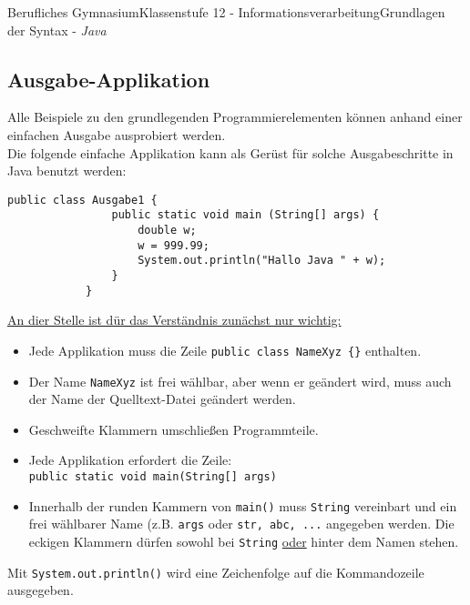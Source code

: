 \documentclass[11pt,oneside,openany,headings=optiontotoc,11pt,numbers=noenddot]{article}
\begin{document}
\begin{worksheet}{Berufliches Gymnasium}{Klassenstufe 12 - Informationsverarbeitung}{Grundlagen der Syntax - \textit{Java}}
		\subsection{Ausgabe-Applikation}
		Alle Beispiele zu den grundlegenden Programmierelementen können anhand einer einfachen Ausgabe ausprobiert werden.\\
		Die folgende \grqq{}einfache\grqq{} Applikation kann als Gerüst für solche Ausgabeschritte in Java benutzt werden:
		\begin{lstlisting}[style=JavaInputStyle]
			public class Ausgabe1 {
				public static void main (String[] args) {
					double w;
					w = 999.99;
					System.out.println("Hallo Java " + w);
				}
			}
		\end{lstlisting}
		\underline{An dier Stelle ist dür das Verständnis zunächst nur wichtig:}
		\begin{itemize}
			\item Jede Applikation muss die Zeile \lstinline[style=JavaInputStyle]|public class NameXyz {}| enthalten.
			\item Der Name \lstinline[style=JavaInputStyle]|NameXyz| ist frei wählbar, aber wenn er geändert wird, muss auch der Name der Quelltext-Datei geändert werden.
			\item Geschweifte Klammern {} umschließen Programmteile.
			\item Jede Applikation erfordert die Zeile:\\
			\lstinline[style=JavaInputStyle]|public static void main(String[] args)|
			\item Innerhalb der runden Kammern von \lstinline[style=JavaInputStyle]|main()| muss \lstinline[style=JavaInputStyle]|String| vereinbart und ein frei wählbarer Name (z.B. \lstinline[style=JavaInputStyle]|args| oder \lstinline[style=JavaInputStyle]|str, abc, ...| angegeben werden. Die eckigen Klammern dürfen sowohl bei \lstinline[style=JavaInputStyle]|String| \underline{oder} hinter dem Namen stehen.
		\end{itemize}
		Mit \lstinline[style=JavaInputStyle]|System.out.println()| wird eine Zeichenfolge auf die Kommandozeile ausgegeben.

\end{worksheet}
\end{document}
